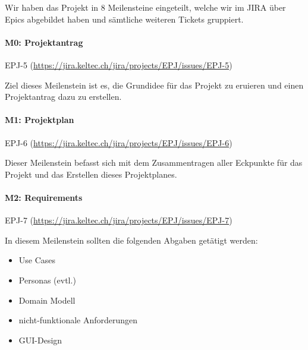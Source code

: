 \documentclass[a4paper]{article}
\def\jiraurl{https://jira.keltec.ch/jira}
\newcommand{\fulljiraissue}[1]{EPJ-#1 (\url{\jiraurl/projects/EPJ/issues/EPJ-#1})}
\begin{document}
Wir haben das Projekt in 8 Meilensteine eingeteilt, welche wir im JIRA über Epics abgebildet haben und sämtliche weiteren Tickets gruppiert.

\paragraph{M0: Projektantrag} \fulljiraissue{5}

Ziel dieses Meilenstein ist es, die Grundidee für das Projekt zu eruieren und einen Projektantrag dazu zu erstellen.

\paragraph{M1: Projektplan} \fulljiraissue{6}

Dieser Meilenstein befasst sich mit dem Zusammentragen aller Eckpunkte für das Projekt und das Erstellen dieses Projektplanes.

\paragraph{M2: Requirements} \fulljiraissue{7}


In diesem Meilenstein sollten die folgenden Abgaben getätigt werden:

\begin{itemize}
  \item Use Cases
  \item Personas (evtl.)
  \item Domain Modell
  \item nicht-funktionale Anforderungen
  \item GUI-Design
\end{itemize}
\end{document}
